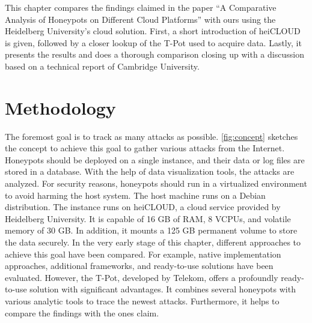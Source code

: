 This chapter compares the findings \citet{Kelly2021} claimed in the paper \enquote{A Comparative Analysis of Honeypots on Different Cloud Platforms} with ours using the Heidelberg University's cloud solution.
First, a short introduction of heiCLOUD is given, followed by a closer lookup of the T-Pot used to acquire data.
Lastly, it presents the results and does a thorough comparison closing up with a discussion based on a technical report of Cambridge University.

\section{Methodology}

The foremost goal is to track as many attacks as possible.
\autoref{fig:concept} sketches the concept to achieve this goal to gather various attacks from the Internet.
Honeypots should be deployed on a single instance, and their data or log files are stored in a database.
With the help of data visualization tools, the attacks are analyzed.
For security reasons, honeypots should run in a virtualized environment to avoid harming the host system.
The host machine runs on a Debian distribution.
The instance runs on heiCLOUD, a cloud service provided by Heidelberg University.
It is capable of 16 GB of RAM, 8 VCPUs, and volatile memory of 30 GB.
In addition, it mounts a 125 GB permanent volume to store the data securely.
In the very early stage of this chapter, different approaches to achieve this goal have been compared.
For example, native implementation approaches, additional frameworks, and ready-to-use solutions have been evaluated.
However, the T-Pot, developed by Telekom, offers a profoundly ready-to-use solution with significant advantages.
It combines several honeypots with various analytic tools to trace the newest attacks.
Furthermore, it helps to compare the findings with the ones \citet{Kelly2021} claim.

